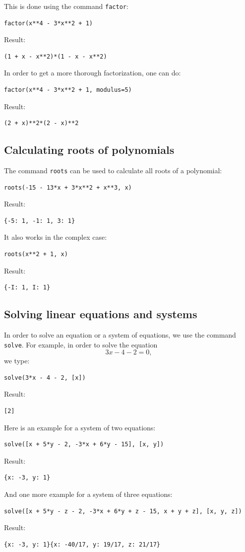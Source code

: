 \documentclass[article,A4,12pt]{llncs}
\begin{document}
This is done using the command {\tt factor}:
\begin{verbatim}
factor(x**4 - 3*x**2 + 1)
\end{verbatim}
Result:
\begin{verbatim}
(1 + x - x**2)*(1 - x - x**2)
\end{verbatim}
In order to get a more thorough factorization, one can do:
\begin{verbatim}
factor(x**4 - 3*x**2 + 1, modulus=5)
\end{verbatim}
Result:
\begin{verbatim}
(2 + x)**2*(2 - x)**2
\end{verbatim}


\subsection{Calculating roots of polynomials}

The command {\tt roots} can be used to calculate all roots of a polynomial:
\begin{verbatim}
roots(-15 - 13*x + 3*x**2 + x**3, x)
\end{verbatim}
Result:
\begin{verbatim}
{-5: 1, -1: 1, 3: 1}
\end{verbatim}
It also works in the complex case:
\begin{verbatim}
roots(x**2 + 1, x)
\end{verbatim}
Result:
\begin{verbatim}
{-I: 1, I: 1}
\end{verbatim}


\subsection{Solving linear equations and systems}

In order to solve an equation or a system of equations, we use the command {\tt solve}.
For example, in order to solve the equation 
$$
3x - 4 - 2 = 0,
$$
we type:
\begin{verbatim}
solve(3*x - 4 - 2, [x])
\end{verbatim}
Result:
\begin{verbatim}
[2]
\end{verbatim}
\noindent
Here is an example for a system of two equations:
\begin{verbatim}
solve([x + 5*y - 2, -3*x + 6*y - 15], [x, y])
\end{verbatim}
Result:
\begin{verbatim}
{x: -3, y: 1}
\end{verbatim}
And one more example for a system of three equations:
\begin{verbatim}
solve([x + 5*y - z - 2, -3*x + 6*y + z - 15, x + y + z], [x, y, z])
\end{verbatim}
Result:
\begin{verbatim}
{x: -3, y: 1}{x: -40/17, y: 19/17, z: 21/17}
\end{verbatim}
\noindent
\end{document}
